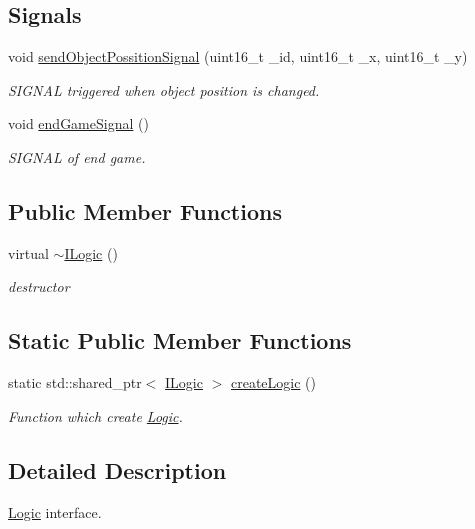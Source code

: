 \subsection*{Signals}
\begin{DoxyCompactItemize}
\item 
void \hyperlink{class_i_logic_a15cc4857190d63f2a836c44fe6d14df7}{send\+Object\+Possition\+Signal} (uint16\+\_\+t \+\_\+id, uint16\+\_\+t \+\_\+x, uint16\+\_\+t \+\_\+y)
\begin{DoxyCompactList}\small\item\em S\+I\+G\+N\+A\+L triggered when object position is changed. \end{DoxyCompactList}\item 
void \hyperlink{class_i_logic_ae9fce47c689cb0de44d44dc93c5786ee}{end\+Game\+Signal} ()
\begin{DoxyCompactList}\small\item\em S\+I\+G\+N\+A\+L of end game. \end{DoxyCompactList}\end{DoxyCompactItemize}
\subsection*{Public Member Functions}
\begin{DoxyCompactItemize}
\item 
virtual \hyperlink{class_i_logic_ab79d6704efa4d2fe1ec53edf709f7ea2}{$\sim$\+I\+Logic} ()
\begin{DoxyCompactList}\small\item\em destructor \end{DoxyCompactList}\end{DoxyCompactItemize}
\subsection*{Static Public Member Functions}
\begin{DoxyCompactItemize}
\item 
static std\+::shared\+\_\+ptr$<$ \hyperlink{class_i_logic}{I\+Logic} $>$ \hyperlink{class_i_logic_a4a6fd23d2360a92705ba02b4532b29e0}{create\+Logic} ()
\begin{DoxyCompactList}\small\item\em Function which create \hyperlink{class_logic}{Logic}. \end{DoxyCompactList}\end{DoxyCompactItemize}


\subsection{Detailed Description}
\hyperlink{class_logic}{Logic} interface. 

